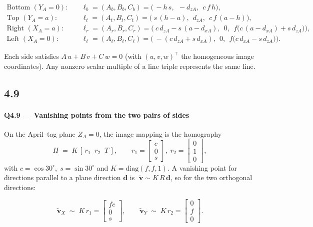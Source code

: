 \documentclass[12pt]{article}
\begin{document}
\[
\boxed{
\begin{aligned}
\text{Bottom }(Y_A=0):\quad
&\ell_b=(A_b,B_b,C_b)=\big(\,-h\,s,\ \ -d_{zA},\ \ c\,f\,h\big),\\[4pt]
\text{Top }(Y_A=a):\quad
&\ell_t=(A_t,B_t,C_t)=\big(\ s\,(h-a),\ \ d_{zA},\ \ c\,f\,(a-h)\big),\\[4pt]
\text{Right }(X_A=a):\quad
&\ell_r=(A_r,B_r,C_r)=\big(\ c\,d_{zA}-s\,(a-d_{xA}),\ \ 0,\ \ f\big(c\,(a-d_{xA})+s\,d_{zA}\big)\big),\\[4pt]
\text{Left }(X_A=0):\quad
&\ell_\ell=(A_\ell,B_\ell,C_\ell)=\big(\ -(c\,d_{zA}+s\,d_{xA}),\ \ 0,\ \ f\big(c\,d_{xA}-s\,d_{zA}\big)\big).
\end{aligned}}
\]

Each side satisfies \(A\,u + B\,v + C\,w = 0\) (with \((u,v,w)^\top\) the homogeneous image
coordinates). Any nonzero scalar multiple of a line triple represents the same line.

\subsection*{4.9}
\paragraph{Q4.9 — Vanishing points from the two pairs of sides}

On the April–tag plane \(Z_A=0\), the image mapping is the homography
\[
H \;=\; K\,[\,r_1\;\; r_2\;\; T\,],\qquad
r_1=\begin{bmatrix}c\\0\\s\end{bmatrix},\;
r_2=\begin{bmatrix}0\\1\\0\end{bmatrix},
\]
with \(c=\cos 30^\circ,\; s=\sin 30^\circ\) and \(K=\mathrm{diag}(f,f,1)\).
A vanishing point for directions parallel to a plane direction \(\mathbf{d}\) is
\(\; \tilde{\mathbf{v}} \sim K\,R\,\mathbf{d}\), so for the two orthogonal directions:

\[
\boxed{
\tilde{\mathbf{v}}_X \;\sim\; K\,r_1
= \begin{bmatrix} f c \\[2pt] 0 \\[2pt] s \end{bmatrix},
\qquad
\tilde{\mathbf{v}}_Y \;\sim\; K\,r_2
= \begin{bmatrix} 0 \\[2pt] f \\[2pt] 0 \end{bmatrix}.
}
\]
\end{document}
